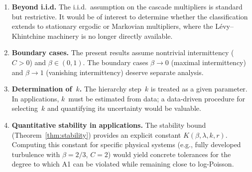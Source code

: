 \documentclass[12pt]{amsart}
\theoremstyle{definition}
\theoremstyle{remark}
\begin{document}
\begin{enumerate}
\item \textbf{Beyond i.i.d.}  The i.i.d.\ assumption on the cascade
  multipliers is standard but restrictive.  It would be of interest to
  determine whether the classification extends to stationary ergodic
  or Markovian multipliers, where the L\'evy--Khintchine machinery is
  no longer directly available.

\item \textbf{Boundary cases.}  The present results assume nontrivial
  intermittency ($C > 0$) and $\beta \in (0,1)$.  The boundary cases
  $\beta \to 0$ (maximal intermittency) and $\beta \to 1$ (vanishing
  intermittency) deserve separate analysis.

\item \textbf{Determination of~$k$.}  The hierarchy step~$k$ is
  treated as a given parameter.  In applications, $k$~must be
  estimated from data; a data-driven procedure for selecting~$k$ and
  quantifying its uncertainty would be valuable.

\item \textbf{Quantitative stability in applications.}  The stability
  bound (Theorem~\ref{thm:stability}) provides an explicit constant
  $K(\beta, \lambda, k, r)$.  Computing this constant for specific
  physical systems (e.g., fully developed turbulence with $\beta =
  2/3$, $C = 2$) would yield concrete tolerances for the degree to
  which A1 can be violated while remaining close to log-Poisson.
\end{enumerate}
\end{document}
